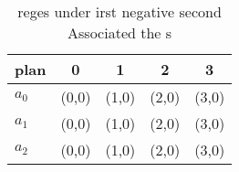 \documentclass[a4paper]{article}
\begin{document}
\begin{table}
\begin{adjustbox}{width=0.6\columnwidth}
\begin{tabular}{|l|l|l|l|l|}
\hline
\textbf{plan} & \multicolumn{1}{c|}{\textbf{0}} & \multicolumn{1}{c|}{\textbf{1}} & \multicolumn{1}{c|}{\textbf{2}} & \multicolumn{1}{c|}{\textbf{3}} \\ \hline
\textbf{$a_0$}  & (0,0) & (1,0) & (2,0) & (3,0) \\ \hline
\textbf{$a_1$}  & (0,0) & (1,0) & (2,0) & (3,0) \\ \hline
\textbf{$a_2$}  & (0,0) & (1,0) & (2,0) & (3,0) \\ \hline
\end{tabular}
\end{adjustbox}
\caption{reges under irst negative second Associated the s
}
\end{table}
\end{document}
